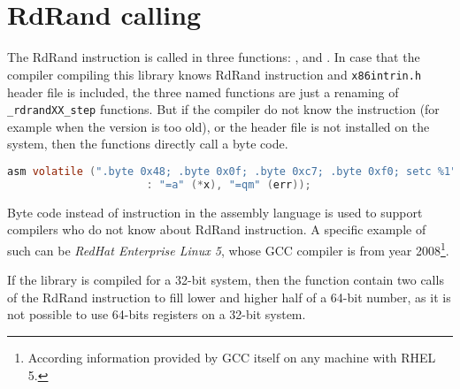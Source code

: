 \\


\\


\section{RdRand calling}
The RdRand instruction is called in three functions: ,  and . In case that the compiler compiling this library knows RdRand instruction and {\tt x86intrin.h} header file is included, the three named functions are just a renaming of {\tt \_rdrandXX\_step} functions. But if the compiler do not know the instruction (for example when the version is too old), or the header file is not installed on the system, then the functions directly call a byte code.
\begin{lstlisting}[frame=none, basicstyle=\footnotesize\ttfamily, language=C, numbers=none, numberstyle=\tiny\color{black},caption= {Byte code called in {\tt rdrand64\_step}.}]
 asm volatile (".byte 0x48; .byte 0x0f; .byte 0xc7; .byte 0xf0; setc %1"
                      : "=a" (*x), "=qm" (err));
\end{lstlisting}

Byte code instead of instruction in the assembly language is used to support compilers who do not know about RdRand instruction. A specific example of such can be {\em RedHat Enterprise Linux 5}, whose GCC compiler is from year 2008\footnote{According information provided by GCC itself on any machine with RHEL 5.}. 

If the library is compiled for a 32-bit system, then the  function contain two calls of the RdRand instruction to fill lower and higher half of a 64-bit number, as it is not possible to use 64-bits registers on a 32-bit system. 


